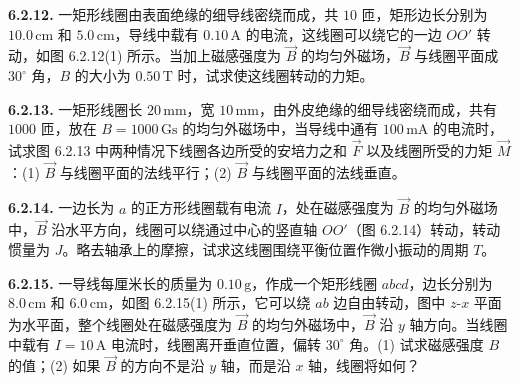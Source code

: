\vfill
\newpage

\textbf{6.2.12.} 一矩形线圈由表面绝缘的细导线密绕而成，共 $10$ 匝，矩形边长分别为 $10.0\,\mathrm{cm}$ 和 $5.0\,\mathrm{cm}$，导线中载有 $0.10\,\mathrm{A}$ 的电流，这线圈可以绕它的一边 $OO'$ 转动，如图 6.2.12(1) 所示。当加上磁感强度为 $\vec{B}$ 的均匀外磁场，$\vec{B}$ 与线圈平面成 $30^{\circ}$ 角，$B$ 的大小为 $0.50\,\mathrm{T}$ 时，试求使这线圈转动的力矩。

\begin{center}
\end{center}

\vfill
\newpage

\textbf{6.2.13.} 一矩形线圈长 $20\,\mathrm{mm}$，宽 $10\,\mathrm{mm}$，由外皮绝缘的细导线密绕而成，共有 $1000$ 匝，放在 $B = 1000\,\mathrm{Gs}$ 的均匀外磁场中，当导线中通有 $100\,\mathrm{mA}$ 的电流时，试求图 6.2.13 中两种情况下线圈各边所受的安培力之和 $\vec{F}$ 以及线圈所受的力矩 $\vec{M}$：(1) $\vec{B}$ 与线圈平面的法线平行；(2) $\vec{B}$ 与线圈平面的法线垂直。

\begin{center}
  \begin{minipage}[b]{0.47\linewidth}
    \centering
  \end{minipage}\hfill
  \begin{minipage}[b]{0.47\linewidth}
    \centering
  \end{minipage}
\end{center}

\vfill
\newpage

\textbf{6.2.14.} 一边长为 $a$ 的正方形线圈载有电流 $I$，处在磁感强度为 $\vec{B}$ 的均匀外磁场中，$\vec{B}$ 沿水平方向，线圈可以绕通过中心的竖直轴 $OO'$（图 6.2.14）转动，转动惯量为 $J$。略去轴承上的摩擦，试求这线圈围绕平衡位置作微小振动的周期 $T$。

\begin{center}
\end{center}

\vfill
\newpage

\textbf{6.2.15.} 一导线每厘米长的质量为 $0.10\,\mathrm{g}$，作成一个矩形线圈 $abcd$，边长分别为 $8.0\,\mathrm{cm}$ 和 $6.0\,\mathrm{cm}$，如图 6.2.15(1) 所示，它可以绕 $ab$ 边自由转动，图中 $z\text{-}x$ 平面为水平面，整个线圈处在磁感强度为 $\vec{B}$ 的均匀外磁场中，$\vec{B}$ 沿 $y$ 轴方向。当线圈中载有 $I = 10\,\mathrm{A}$ 电流时，线圈离开垂直位置，偏转 $30^{\circ}$ 角。(1) 试求磁感强度 $B$ 的值；(2) 如果 $\vec{B}$ 的方向不是沿 $y$ 轴，而是沿 $x$ 轴，线圈将如何？

